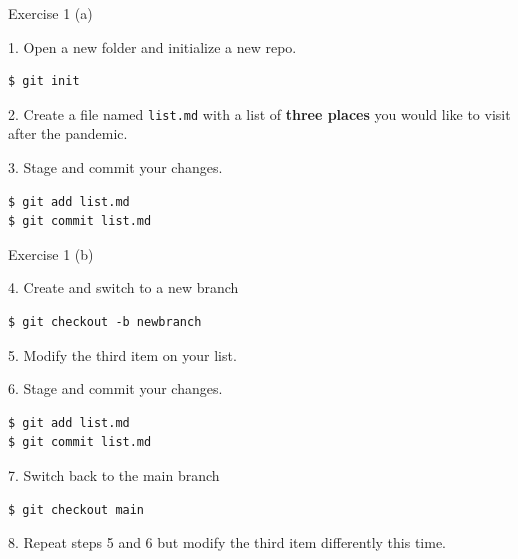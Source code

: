 \documentclass[handout]{beamer}
\begin{document}
\begin{frame}[fragile]{Exercise 1 (a)}

1. Open a new folder and initialize a new repo.
\begin{lstlisting}
$ git init 
\end{lstlisting}
2. Create a file named \texttt{list.md} with a list of \textbf{three places} you would like to visit after the pandemic.

\vspace{0.3cm}

3. Stage and commit your changes.

\begin{lstlisting}
$ git add list.md
$ git commit list.md
\end{lstlisting}

\end{frame}

\begin{frame}[fragile]{Exercise 1 (b)}

4. Create and switch to a new branch
\begin{lstlisting}
$ git checkout -b newbranch
\end{lstlisting}

5. Modify the third item on your list.

\vspace{0.3cm}

6. Stage and commit your changes.

\begin{lstlisting}
$ git add list.md
$ git commit list.md
\end{lstlisting}

7. Switch back to the main branch
\begin{lstlisting}
$ git checkout main
\end{lstlisting}

8. Repeat steps 5 and 6 but modify the third item differently this time. 

\end{frame}
\end{document}
